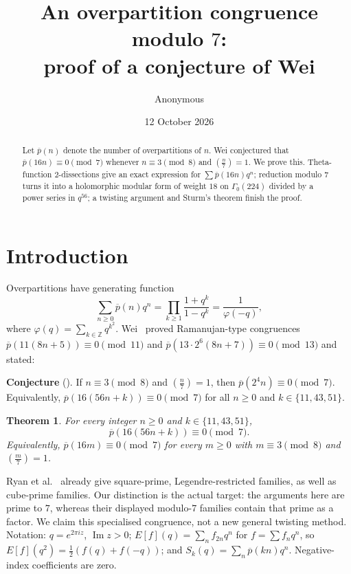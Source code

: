 \documentclass[11pt]{article}
\title{An overpartition congruence modulo $7$:\\ proof of a conjecture of Wei}
\author{Anonymous}\date{12 October 2026}
\newtheorem{theorem}{Theorem}\newtheorem{lemma}[theorem]{Lemma}\newtheorem{proposition}[theorem]{Proposition}
\theoremstyle{remark}\newtheorem{remark}[theorem]{Remark}
\newcommand{\pb}{\overline{p}}
\begin{document}
\maketitle
\begin{abstract}
Let $\pb(n)$ denote the number of overpartitions of $n$. Wei conjectured that $\pb(16n)\equiv0\pmod 7$ whenever $n\equiv3\pmod 8$ and $\left(\frac n7\right)=1$. We prove this. Theta-function $2$-dissections give an exact expression for $\sum\pb(16n)q^n$; reduction modulo $7$ turns it into a holomorphic modular form of weight $18$ on $\Gamma_0(224)$ divided by a power series in $q^{56}$; a twisting argument and Sturm's theorem finish the proof.
\end{abstract}

\section{Introduction}
Overpartitions have generating function
\[\sum_{n\ge0}\pb(n)q^n=\prod_{k\ge1}\frac{1+q^k}{1-q^k}=\frac1{\varphi(-q)},\]
where $\varphi(q)=\sum_{k\in\mathbb Z}q^{k^2}$. Wei~\cite{Wei} proved Ramanujan-type congruences $\pb(11(8n+5))\equiv0\pmod{11}$ and $\pb(13\cdot2^6(8n+7))\equiv0\pmod{13}$ and stated:

\medskip\noindent\textbf{Conjecture} (\cite[Conjecture 4.1]{Wei}). If $n\equiv3\pmod8$ and $\left(\frac n7\right)=1$, then $\pb(2^4n)\equiv0\pmod 7$. Equivalently, $\pb(16(56n+k))\equiv0\pmod7$ for all $n\ge0$ and $k\in\{11,43,51\}$.

\begin{theorem}\label{thm} For every integer $n\ge0$ and $k\in\{11,43,51\}$,
\[\pb(16(56n+k))\equiv0\pmod7.\]
Equivalently, $\pb(16m)\equiv0\pmod7$ for every $m\ge0$ with $m\equiv3\pmod8$ and $\left(\frac m7\right)=1$.\end{theorem}

Ryan et al.~\cite[Theorems 1.3 and 1.5]{RSVZ} already give square-prime, Legendre-restricted families, as well as cube-prime families. Our distinction is the actual target: the arguments here are prime to $7$, whereas their displayed modulo-$7$ families contain that prime as a factor. We claim this specialised congruence, not a new general twisting method. Notation: $q=e^{2\pi iz}$, $\operatorname{Im}z>0$; $E[f](q)=\sum_n f_{2n}q^n$ for $f=\sum f_nq^n$, so $E[f](q^2)=\frac12(f(q)+f(-q))$; and $S_k(q)=\sum_n\pb(kn)q^n$. Negative-index coefficients are zero.
\end{document}
